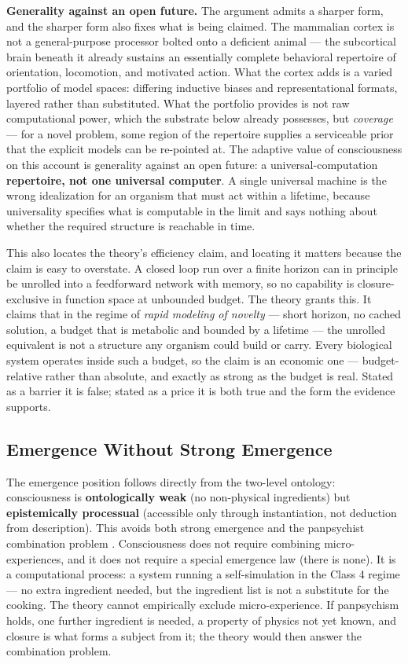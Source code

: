 \documentclass[12pt]{article}
\begin{document}
\textbf{Generality against an open future.} The argument admits a sharper form, and the sharper form also fixes what is being claimed. The mammalian cortex is not a general-purpose processor bolted onto a deficient animal --- the subcortical brain beneath it already sustains an essentially complete behavioral repertoire of orientation, locomotion, and motivated action. What the cortex adds is a varied portfolio of model spaces: differing inductive biases and representational formats, layered rather than substituted. What the portfolio provides is not raw computational power, which the substrate below already possesses, but \emph{coverage} --- for a novel problem, some region of the repertoire supplies a serviceable prior that the explicit models can be re-pointed at. The adaptive value of consciousness on this account is generality against an open future: a universal-computation \textbf{repertoire, not one universal computer}. A single universal machine is the wrong idealization for an organism that must act within a lifetime, because universality specifies what is computable in the limit and says nothing about whether the required structure is reachable in time.

This also locates the theory's efficiency claim, and locating it matters because the claim is easy to overstate. A closed loop run over a finite horizon can in principle be unrolled into a feedforward network with memory, so no capability is closure-exclusive in function space at unbounded budget. The theory grants this. It claims that in the regime of \emph{rapid modeling of novelty} --- short horizon, no cached solution, a budget that is metabolic and bounded by a lifetime --- the unrolled equivalent is not a structure any organism could build or carry. Every biological system operates inside such a budget, so the claim is an economic one --- budget-relative rather than absolute, and exactly as strong as the budget is real. Stated as a barrier it is false; stated as a price it is both true and the form the evidence supports.


\subsection{Emergence Without Strong Emergence}


The emergence position follows directly from the two-level ontology: consciousness is \textbf{ontologically weak} (no non-physical ingredients) but \textbf{epistemically processual} (accessible only through instantiation, not deduction from description). This avoids both strong emergence \citep{Kim1993} and the panpsychist combination problem \citep{Chalmers2016}. Consciousness does not require combining micro-experiences, and it does not require a special emergence law (there is none). It is a computational process: a system running a self-simulation in the Class 4 regime --- no extra ingredient needed, but the ingredient list is not a substitute for the cooking. The theory cannot empirically exclude micro-experience. If panpsychism holds, one further ingredient is needed, a property of physics not yet known, and closure is what forms a subject from it; the theory would then answer the combination problem.
\end{document}
